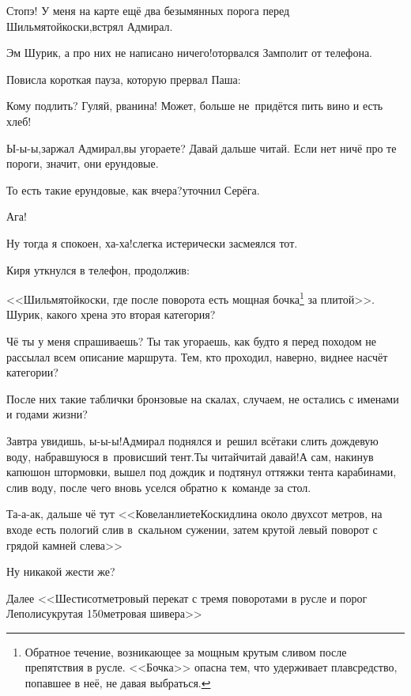 \diagdash Стопэ! У меня на карте ещё два безымянных порога перед Шильмятойкоски,\mdash встрял Адмирал.

\diagdash Эм\myldots{} Шурик, а про них не написано ничего!\mdash оторвался Замполит от телефона.

Повисла короткая пауза, которую прервал Паша:

\diagdash Кому подлить? Гуляй, рванина! Может, больше не~придётся пить вино и есть хлеб!

\diagdash Ы-ы-ы,\mdash заржал Адмирал,\mdash вы угораете? Давай дальше читай. Если нет ничё про те пороги, значит, они ерундовые.

\diagdash То есть такие ерундовые, как вчера?\mdash уточнил Серёга.

\diagdash Ага!

\diagdash Ну тогда я спокоен, ха-ха!\mdash слегка истерически засмеялся тот.

Киря уткнулся в телефон, продолжив:

\renewcommand*{\thefootnote}{\fnsymbol{footnote}}
\setcounter{footnote}{0}
\diagdash <<\myldots{}Шильмятойкоски, где после поворота есть мощная бочка\footnote{Обратное течение, возникающее за мощным крутым сливом после препятствия в русле. <<Бочка>> опасна тем, что удерживает плавсредство, попавшее в неё, не давая выбраться.} за плитой>>. Шурик, какого хрена это вторая категория?

\diagdash Чё ты у меня спрашиваешь? Ты так угораешь, как будто я перед походом не рассылал всем описание маршрута. Тем, кто проходил, наверно, виднее насчёт категории? 

\diagdash После них такие таблички бронзовые на скалах, случаем, не остались с именами и годами жизни?

\diagdash Завтра увидишь, ы-ы-ы!\mdash Адмирал поднялся и~решил всё\sdash таки слить дождевую воду, набравшуюся в~провисший тент.\mdash Ты читай\sdash читай давай!\mdash А сам, накинув капюшон штормовки, вышел под дождик и подтянул оттяжки тента карабинами, слив воду, после чего вновь уселся обратно к~команде за стол.

\diagdash Та-а-ак, дальше чё тут\myldots{} <<Ковеланлиете\sdash Коски\mdash длина около двухсот метров, на входе есть пологий слив в~скальном сужении, затем крутой левый поворот с грядой камней слева>>\myldots{}

\diagdash Ну никакой жести же?

\diagdash Далее\myldots{} <<Шестисотметровый перекат с тремя поворотами в русле и порог Леполису\mdash крутая 150\sdash метровая шивера>>\myldots{}


